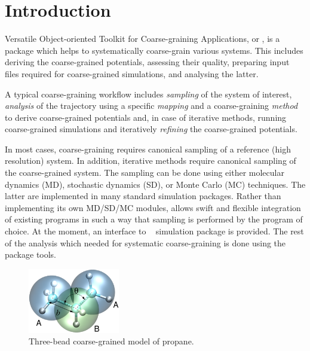 \chapter{Introduction}


Versatile Object-oriented Toolkit for Coarse-graining Applications, or \votca, is a package which helps to systematically coarse-grain various systems. This includes  deriving the coarse-grained potentials, assessing their quality, preparing input files required for coarse-grained simulations, and analysing the latter. 

A typical coarse-graining workflow includes {\em sampling} of the system of interest, {\em analysis} of the trajectory using a specific {\em mapping} and a coarse-graining {\em method} to derive coarse-grained potentials and, in case of iterative methods, running coarse-grained simulations and iteratively {\em refining} the coarse-grained potentials.

In most cases, coarse-graining requires canonical sampling of a reference (high resolution) system. In addition, iterative methods require canonical sampling of the coarse-grained system. The sampling can be done using either molecular dynamics (MD), stochastic dynamics (SD), or Monte Carlo (MC) techniques. The latter are implemented in many standard simulation packages. Rather than implementing its own MD/SD/MC modules, \votca allows swift and flexible integration of existing  programs in such a way that sampling is performed by the program of choice. At the moment, an interface to \gromacs~\cite{gromacs4} simulation package is provided. The rest of the analysis which needed for systematic coarse-graining is done using the package tools.

\begin{figure}
 \includegraphics[width=4cm]{fig/propane}
 \caption{\small Three-bead coarse-grained model of propane.
 \label{fig:intro:propane}
}
\end{figure}

